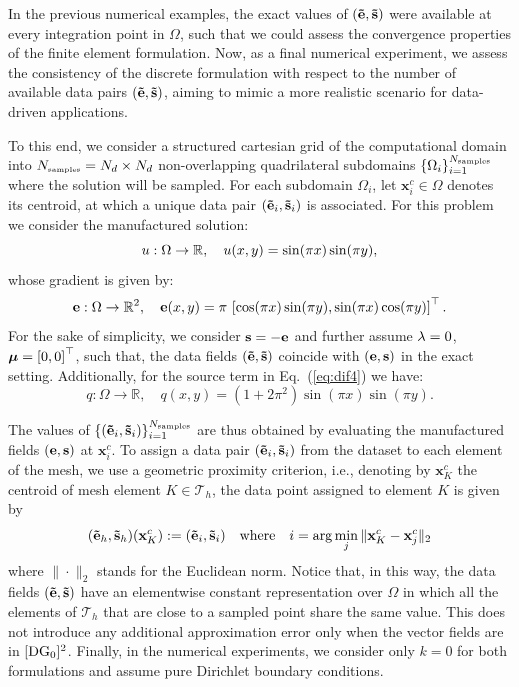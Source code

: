 In the previous numerical examples, the exact values of $ (\mathbf{\tilde{e}}, \mathbf{\tilde{s}}) $ were available at every integration point in $\Omega$, such that we could assess the convergence
properties of the finite element formulation. 
Now, as a final numerical experiment, we assess the consistency of the discrete 
formulation with respect to the number of available data pairs $ (\mathbf{\tilde{e}}, \mathbf{\tilde{s}}) $, aiming 
to mimic a more realistic scenario for data-driven applications. 

To this end, we consider a structured cartesian grid of the computational domain into $N_{\mbox{\tiny samples}} = N_d \times N_d$ non-overlapping quadrilateral subdomains $ \{\Omega_i\}_{i=1}^{N_{\mbox{\tiny samples}}} $ where the solution will be sampled. For each subdomain $ \Omega_i $, let $\mathbf{x}_{i}^{c} \in \Omega$ denotes its centroid, at which a unique data pair $(\mathbf{\tilde{e}}_i, \mathbf{\tilde{s}}_i)$ is associated. For this problem we consider the manufactured solution: 
\begin{equation}
	u: \Omega \rightarrow \mathbb{R}, \quad u(x,y) = \sin(\pi x)\sin(\pi y),
\end{equation}
whose gradient is given by:
\begin{equation}
	\mathbf{e}: \Omega \rightarrow \mathbb{R}^{2}, \quad \mathbf{e}(x,y) = \pi \, \left[\cos(\pi x)\sin(\pi y), \sin(\pi x)\cos(\pi y) \right]^{\top}.
\end{equation}
For the sake of simplicity, we consider $ \mathbf{s} = -\mathbf{e} $ and further assume $\lambda  = 0$, $ \boldsymbol{\mu} = \left[0,0\right]^{\top}$,
such that, the data fields $(\mathbf{\tilde{e}}, \mathbf{\tilde{s}})$ coincide with $(\mathbf{e}, \mathbf{s})$ in the exact setting. 
Additionally, for the source term in Eq.~(\ref{eq:dif4}) we have: 
$$
q: \Omega \rightarrow \mathbb{R}, \quad q(x,y) = \left(1 + 2\pi^2 \right)\sin(\pi x)\sin(\pi y).
$$

The values of $\{(\mathbf{\tilde{e}}_i, \mathbf{\tilde{s}}_i)\}_{i=1}^{N_{\mbox{\tiny samples}}}$ are thus obtained by evaluating the manufactured fields $(\mathbf{e}, \mathbf{s})$ at $\mathbf{x}_{i}^{c}$. To assign a data pair $ (\mathbf{\tilde{e}}_i, \mathbf{\tilde{s}}_i) $ from the dataset to each element of the mesh, we use a geometric proximity criterion, i.e., denoting by $ \mathbf{x}_K^{c} $ the centroid of mesh 
element $ K \in \mathcal{T}_h $, the data point assigned to element $K$ is given by
\begin{equation}
	(\mathbf{\tilde{e}}_h, \mathbf{\tilde{s}}_h)(\mathbf{x}_{K}^{c}) := (\mathbf{\tilde{e}}_i, \mathbf{\tilde{s}}_i) \quad \text{where} \quad i = \arg\min_{j} \| \mathbf{x}_K^{c} - \mathbf{x}_{j}^{c} \|_2
\end{equation}
where $\| \cdot \|_2$ stands for the Euclidean norm. Notice that, in this way, the data fields $(\mathbf{\tilde{e}}, \mathbf{\tilde{s}})$
have an elementwise constant representation over $\Omega$ in which all the elements of
$\mathcal{T}_h$ that are close to a sampled point share the same value. 
This does not introduce any additional
approximation error only when the vector fields are in $[\text{DG}_0]^2$.
Finally, in the numerical experiments, we consider only $ k=0 $ for both formulations 
and assume pure Dirichlet boundary conditions.

